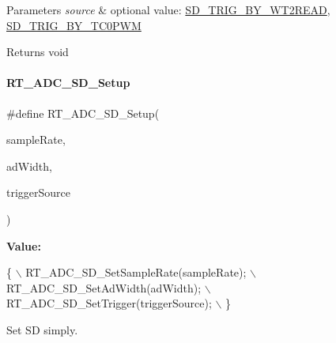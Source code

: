 \begin{DoxyParams}{Parameters}
{\em source} & optional value\+: \mbox{\hyperlink{a00002_ab266bb772aaf5cffad6bede99cfb094ca9596adcc3a82f8e983e664a6ed5144a6}{S\+D\+\_\+\+T\+R\+I\+G\+\_\+\+B\+Y\+\_\+\+W\+T2\+R\+E\+AD}}, \mbox{\hyperlink{a00002_ab266bb772aaf5cffad6bede99cfb094ca2da9ae6568d907b90ab68f56f8605ada}{S\+D\+\_\+\+T\+R\+I\+G\+\_\+\+B\+Y\+\_\+\+T\+C0\+P\+WM}} \\
\hline
\end{DoxyParams}
\begin{DoxyReturn}{Returns}
void 
\end{DoxyReturn}
\mbox{\label{a00002_a312f152517ab50c1cda791e118dd4473}} 
\paragraph{\texorpdfstring{R\+T\+\_\+\+A\+D\+C\+\_\+\+S\+D\+\_\+\+Setup}{RT\_ADC\_SD\_Setup}}
{\footnotesize\ttfamily \#define R\+T\+\_\+\+A\+D\+C\+\_\+\+S\+D\+\_\+\+Setup(\begin{DoxyParamCaption}\item[{}]{sample\+Rate,  }\item[{}]{ad\+Width,  }\item[{}]{trigger\+Source }\end{DoxyParamCaption})}

{\bfseries Value\+:}
\begin{DoxyCode}
\{                                        \(\backslash\)
        RT\_ADC\_SD\_SetSampleRate(sampleRate); \(\backslash\)
        RT\_ADC\_SD\_SetAdWidth(adWidth);      \(\backslash\)
        RT\_ADC\_SD\_SetTrigger(triggerSource); \(\backslash\)
    \}
\end{DoxyCode}


Set SD simply. 


